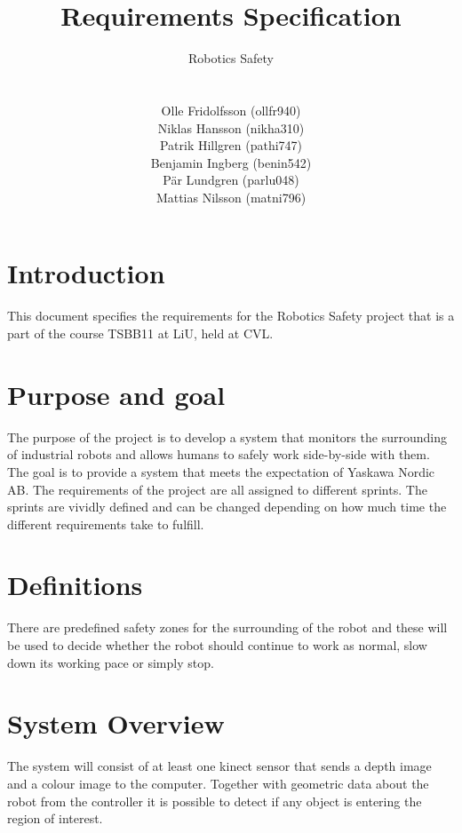 \documentclass[10pt,a4paper]{article}
\title{Requirements Specification}
\author{\begin{large}{Robotics Safety}\end{large}\\\\
Olle Fridolfsson (ollfr940) \\  Niklas Hansson (nikha310) \\ Patrik Hillgren (pathi747) \\ Benjamin Ingberg (benin542)\\ Pär Lundgren (parlu048) \\ Mattias Nilsson (matni796)}
\begin{document}
\maketitle
\newpage
\tableofcontents
\newpage
\noindent %
\section{Introduction}
This document specifies the requirements for the Robotics Safety project that is a part of the course TSBB11 at LiU, held at CVL.
\section{Purpose and goal}
The purpose of the project is to develop a system that monitors the surrounding of industrial robots and allows humans to safely work side-by-side with them. 
The goal is to provide a system that meets the expectation of Yaskawa Nordic AB.
The requirements of the project are all assigned to different sprints. The sprints are vividly defined and can be changed depending on how much time the different requirements take to fulfill. 

\section{Definitions}
There are predefined safety zones for the surrounding of the robot and these will be used to decide whether the robot should continue to work as normal, slow down its working pace or simply stop.

\section{System Overview}
The system will consist of at least one kinect sensor that sends a depth image and a colour image to the computer. Together with geometric data about the robot from the controller it is possible to detect if any object is entering the region of interest.
\end{document}
